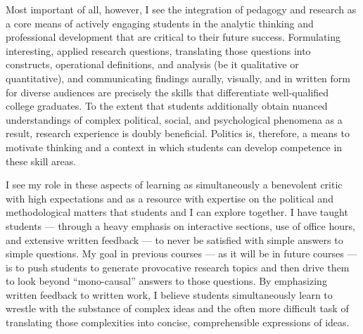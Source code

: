 \documentclass[12pt]{article}
\begin{document}
Most important of all, however, I see the integration of pedagogy and research as a core means of actively engaging students in the analytic thinking and professional development that are critical to their future success.
Formulating interesting, applied research questions, translating those questions into constructs, operational definitions, and analysis (be it qualitative or quantitative), and communicating findings aurally, visually, and in written form for diverse audiences are precisely the skills that differentiate well-qualified college graduates. To the extent that students additionally obtain nuanced understandings of complex political, social, and psychological phenomena as a result, research experience is doubly beneficial. Politics is, therefore, a means to motivate thinking and a context in which students can develop competence in these skill areas.

I see my role in these aspects of learning as simultaneously a benevolent critic with high expectations and as a resource with expertise on the political and methodological matters that students and I can explore together. %
I have taught students --- through a heavy emphasis on interactive sections, use of office hours, and extensive written feedback --- to never be satisfied with simple answers to simple questions. My goal in previous courses --- as it will be in future courses --- is to push students to generate provocative research topics and then drive them to look beyond ``mono-causal'' answers to those questions. By emphasizing written feedback to written work, I believe students simultaneously learn to wrestle with the substance of complex ideas and the often more difficult task of translating those complexities into concise, comprehensible expressions of ideas.
\end{document}
